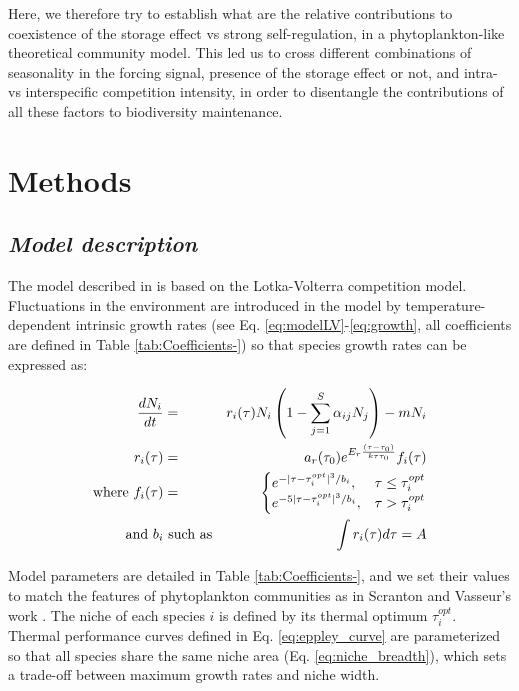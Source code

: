 \documentclass[a4paper,12pt]{article}
\begin{document}
Here, we therefore try to establish what are the relative contributions
to coexistence of the storage effect vs strong self-regulation, in
a phytoplankton-like theoretical community model. This led us to cross
different combinations of seasonality in the forcing signal, presence
of the storage effect or not, and intra- vs interspecific competition
intensity, in order to disentangle the contributions of all these
factors to biodiversity maintenance.
 
\section*{Methods}

\subsection*{\emph{Model description}}

The model described in \citet{scranton_coexistence_2016} is based
on the Lotka-Volterra competition model. Fluctuations in the environment
are introduced in the model by temperature-dependent intrinsic growth
rates (see Eq. \ref{eq:modelLV}-\ref{eq:growth}, all coefficients
are defined in Table \ref{tab:Coefficients-}) so that species growth
rates can be expressed as:

\begin{eqnarray}
\frac{dN_{i}}{dt} & = & r_{i}(\tau)N_{i}\left(1-\sum_{j=1}^{S}\alpha_{ij}N_{j}\right)-mN_{i}\label{eq:modelLV}\\
r_{i}(\tau) & = & a_{r}(\tau_{0})e^{E_{r}\frac{(\tau-\tau_{\text{0}})}{k\tau\tau_{0}}}f_{i}(\tau)\label{eq:growth}\\
\textnormal{where }f_{i}(\tau) & = & \begin{cases}
e^{-|\tau-\tau_{i}^{opt}|^{3}/b_{i}}, & \tau\leq\tau_{i}^{opt}\\
e^{-5|\tau-\tau_{i}^{opt}|^{3}/b_{i}}, & \tau>\tau_{i}^{opt}
\end{cases}\label{eq:eppley_curve}\\
\textnormal{and } b_{i}&\text{ such as} & \int r_{i}(\tau)d\tau=A\label{eq:niche_breadth}
\end{eqnarray}

Model parameters are detailed in Table \ref{tab:Coefficients-}, and
we set their values to match the features of phytoplankton communities
as in Scranton and Vasseur's work \citeyearpar{scranton_coexistence_2016}.
The niche of each species $i$ is defined by its thermal optimum $\tau_{i}^{opt}$.
Thermal performance curves defined in Eq. \ref{eq:eppley_curve} are
parameterized so that all species share the same niche area (Eq. \ref{eq:niche_breadth}),
which sets a trade-off between maximum growth rates and niche width. 
\end{document}
